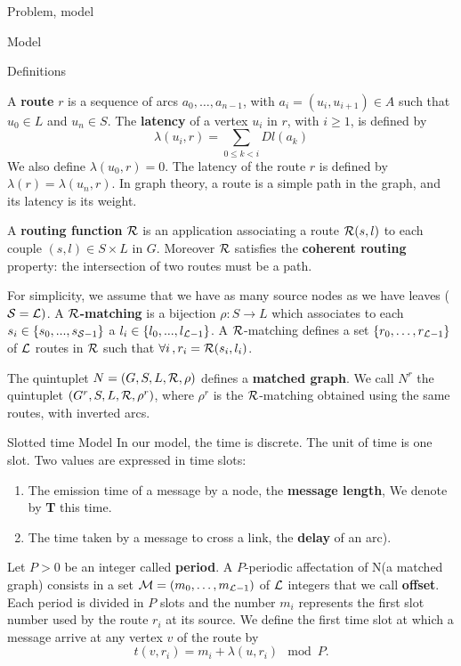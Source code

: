 \documentclass[a4paper,10pt]{report}
\newcommand\rmatching{${\cal R}$-matching\xspace}
\newcommand\matchedgraph{{\bf matched graph}}
\begin{document}
\begin{chapter}{Problem, model}
\begin{section}{Model}
\begin{subsection}{Definitions}
\begin{center}
{{}}\end{center}

A {\bf route} $r$ is a sequence of arcs $a_0, \ldots , a_{n-1}$, with $a_i=(u_i,u_{i+1}) \in A$ such that $u_0 \in L$ and $u_n \in S$.
The {\bf latency} of a vertex $u_i$ in $r$, with $i \geq 1$, is defined by $$\lambda(u_i,r)= \sum\limits_{0 \leq k <i} Dl(a_k)$$ We also define $\lambda(u_0,r)=0$.
The latency of the route $r$ is defined by $\lambda (r)= \lambda (u_n,r)$. In graph theory, a route is a simple path in the graph, and its latency is its weight. 


A {\bf routing function}  ${\cal R}$ is an application associating a route  ${\cal R}(s,l)$ to each couple $(s,l) \in S \times L$ in $G$.
Moreover ${\cal R}$ satisfies the {\bf coherent routing} property: the intersection of two routes must be a path.

For simplicity, we assume that we have as many source nodes as we have leaves (${\cal S} = {\cal L})$.
A {\bf ${\cal R}$-matching} is a bijection $\rho:S\rightarrow L$ which associates to each $s_i \in \{s_0,...,s_{{\cal S}-1}\}$ 
a $l_i \in \{l_0,...,l_{{\cal L}-1}\}$.
A \rmatching defines a set $\{r_0, \ldots ,r_{{\cal L}-1}\}$ of ${\cal L}$ routes in ${\cal R}$ such that $\forall i\,, r_i = {\cal R}(s_i,l_i)$.

The quintuplet $N=(G,S,L,{\cal R},\rho)$ defines a \matchedgraph. We call $N^r$ the quintuplet $(G^r,S,L,{\cal R},\rho^r)$, 
where $\rho^r$ is the \rmatching obtained using the same routes, with inverted arcs.

\end{subsection}
\begin{subsection}{Slotted time Model}
In our model, the time is discrete. The unit of time is one slot. Two values are expressed in time slots: 
\begin{enumerate}
 \item The emission time of a message by a node, the {\bf message length}, We denote by {\bf T} this time.
 \item The time taken by a message to cross a link, the {\bf delay} of an arc).
\end{enumerate}

Let $P>0$ be an integer called {\bf period}. 
A $P$-periodic affectation of N(a matched graph) consists in a set  ${\cal M}=(m_0, \ldots ,m_{{\cal L}-1})$
of ${\cal L}$ integers that we call {\bf offset}. 
Each period is divided in $P$ slots and the number $m_i$ represents the first slot number used by the route $r_i$ at its source.
We define the first time slot at which a message arrive at any vertex $v$ of the route by $$t(v,r_i) = m_i+\lambda(u,r_i) \mod P.$$


\end{subsection}
\end{section}
\end{chapter}
\end{document}
